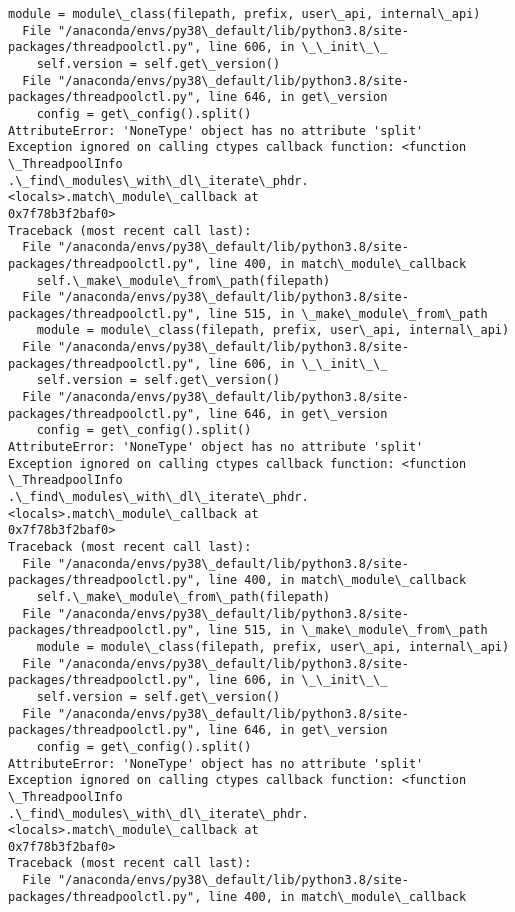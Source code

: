 \documentclass[11pt]{article}
\begin{document}
\begin{Verbatim}[commandchars=\\\{\}]
    module = module\_class(filepath, prefix, user\_api, internal\_api)
  File "/anaconda/envs/py38\_default/lib/python3.8/site-
packages/threadpoolctl.py", line 606, in \_\_init\_\_
    self.version = self.get\_version()
  File "/anaconda/envs/py38\_default/lib/python3.8/site-
packages/threadpoolctl.py", line 646, in get\_version
    config = get\_config().split()
AttributeError: 'NoneType' object has no attribute 'split'
Exception ignored on calling ctypes callback function: <function \_ThreadpoolInfo
.\_find\_modules\_with\_dl\_iterate\_phdr.<locals>.match\_module\_callback at
0x7f78b3f2baf0>
Traceback (most recent call last):
  File "/anaconda/envs/py38\_default/lib/python3.8/site-
packages/threadpoolctl.py", line 400, in match\_module\_callback
    self.\_make\_module\_from\_path(filepath)
  File "/anaconda/envs/py38\_default/lib/python3.8/site-
packages/threadpoolctl.py", line 515, in \_make\_module\_from\_path
    module = module\_class(filepath, prefix, user\_api, internal\_api)
  File "/anaconda/envs/py38\_default/lib/python3.8/site-
packages/threadpoolctl.py", line 606, in \_\_init\_\_
    self.version = self.get\_version()
  File "/anaconda/envs/py38\_default/lib/python3.8/site-
packages/threadpoolctl.py", line 646, in get\_version
    config = get\_config().split()
AttributeError: 'NoneType' object has no attribute 'split'
Exception ignored on calling ctypes callback function: <function \_ThreadpoolInfo
.\_find\_modules\_with\_dl\_iterate\_phdr.<locals>.match\_module\_callback at
0x7f78b3f2baf0>
Traceback (most recent call last):
  File "/anaconda/envs/py38\_default/lib/python3.8/site-
packages/threadpoolctl.py", line 400, in match\_module\_callback
    self.\_make\_module\_from\_path(filepath)
  File "/anaconda/envs/py38\_default/lib/python3.8/site-
packages/threadpoolctl.py", line 515, in \_make\_module\_from\_path
    module = module\_class(filepath, prefix, user\_api, internal\_api)
  File "/anaconda/envs/py38\_default/lib/python3.8/site-
packages/threadpoolctl.py", line 606, in \_\_init\_\_
    self.version = self.get\_version()
  File "/anaconda/envs/py38\_default/lib/python3.8/site-
packages/threadpoolctl.py", line 646, in get\_version
    config = get\_config().split()
AttributeError: 'NoneType' object has no attribute 'split'
Exception ignored on calling ctypes callback function: <function \_ThreadpoolInfo
.\_find\_modules\_with\_dl\_iterate\_phdr.<locals>.match\_module\_callback at
0x7f78b3f2baf0>
Traceback (most recent call last):
  File "/anaconda/envs/py38\_default/lib/python3.8/site-
packages/threadpoolctl.py", line 400, in match\_module\_callback

\end{Verbatim}
\end{document}
